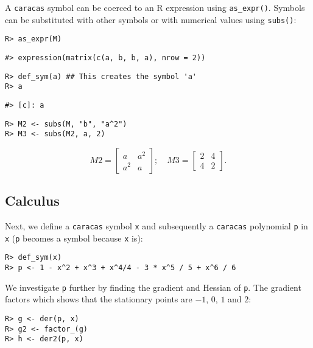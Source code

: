 A \texttt{caracas} symbol can be coerced to an R expression
using \texttt{as\_expr()}.
Symbols can be substituted with other symbols or with numerical values
using \texttt{subs()}:

\begin{verbatim}
R> as_expr(M)
\end{verbatim}

\begin{verbatim}
#> expression(matrix(c(a, b, b, a), nrow = 2))
\end{verbatim}

\begin{verbatim}
R> def_sym(a) ## This creates the symbol 'a'
R> a
\end{verbatim}

\begin{verbatim}
#> [c]: a
\end{verbatim}

\begin{verbatim}
R> M2 <- subs(M, "b", "a^2")
R> M3 <- subs(M2, a, 2)
\end{verbatim}

\[
M2 = \left[\begin{matrix}a & a^{2}\\a^{2} & a\end{matrix}\right]; \quad
M3 = \left[\begin{matrix}2 & 4\\4 & 2\end{matrix}\right].
\]

\hypertarget{calculus}{%
\subsection{Calculus}\label{calculus}}

Next, we define a \texttt{caracas} symbol \texttt{x} and
subsequently a \texttt{caracas} polynomial \texttt{p} in \texttt{x} (\texttt{p} becomes a symbol because \texttt{x} is):

\begin{verbatim}
R> def_sym(x)  
R> p <- 1 - x^2 + x^3 + x^4/4 - 3 * x^5 / 5 + x^6 / 6
\end{verbatim}

We investigate \texttt{p} further by finding the gradient and Hessian of \texttt{p}. The gradient factors which shows that the stationary
points are \(-1\), \(0\), \(1\) and \(2\):

\begin{verbatim}
R> g <- der(p, x) 
R> g2 <- factor_(g)
R> h <- der2(p, x)
\end{verbatim}

